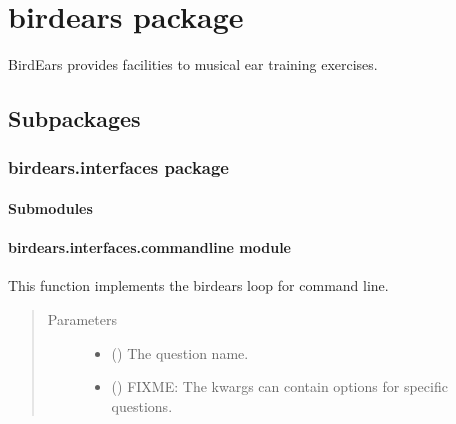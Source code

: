 \documentclass[letterpaper,10pt,english]{sphinxmanual}
\begin{document}
\chapter{birdears package}
\label{\detokenize{birdears:module-birdears}}\label{\detokenize{birdears::doc}}\label{\detokenize{birdears:birdears-package}}
BirdEars provides facilities to musical ear training exercises.


\section{Subpackages}
\label{\detokenize{birdears:subpackages}}

\subsection{birdears.interfaces package}
\label{\detokenize{birdears.interfaces::doc}}\label{\detokenize{birdears.interfaces:module-birdears.interfaces}}\label{\detokenize{birdears.interfaces:birdears-interfaces-package}}

\subsubsection{Submodules}
\label{\detokenize{birdears.interfaces:submodules}}

\subsubsection{birdears.interfaces.commandline module}
\label{\detokenize{birdears.interfaces:birdears-interfaces-commandline-module}}\label{\detokenize{birdears.interfaces:module-birdears.interfaces.commandline}}

\begin{fulllineitems}
\label{\detokenize{birdears.interfaces:birdears.interfaces.commandline.CommandLine}}
This function implements the birdears loop for command line.
\begin{quote}\begin{description}
\item[{Parameters}] \leavevmode\begin{itemize}
\item {} 
 () \textendash{} The question name.

\item {} 
 () \textendash{} FIXME: The kwargs can contain options for specific
questions.

\end{itemize}

\end{description}\end{quote}

\end{fulllineitems}
\end{document}
